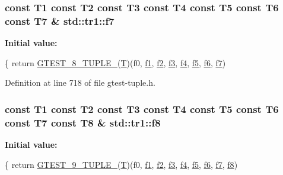 \subsubsection[{\texorpdfstring{f7}{f7}}]{\setlength{\rightskip}{0pt plus 5cm}const T1 const T2 const T3 const T4 const T5 const T6 const T7 \& std\+::tr1\+::f7}\hypertarget{namespacestd_1_1tr1_a2185f3a1c07f2df072c39cb91ffa89a4}{}\label{namespacestd_1_1tr1_a2185f3a1c07f2df072c39cb91ffa89a4}
{\bfseries Initial value\+:}
\begin{DoxyCode}
\{
  \textcolor{keywordflow}{return} \hyperlink{gtest-tuple_8h_a2bc36d1a71a551e6cda2ac5504fb7ce3}{GTEST\_8\_TUPLE\_}(\hyperlink{all__17_8js_adf1f3edb9115acb0a1e04209b7a9937b}{T})(f0, \hyperlink{namespacestd_1_1tr1_a9c0fa65b105f8e2f58ba59ecf75fd000}{f1}, \hyperlink{namespacestd_1_1tr1_a87dd9e009868361317f587126dba63d4}{f2}, \hyperlink{namespacestd_1_1tr1_a0f7c3b47d27d42d82d1a333ea420ce4e}{f3}, \hyperlink{namespacestd_1_1tr1_adc796e02b7385d526aff708189564f67}{f4}, \hyperlink{namespacestd_1_1tr1_a9c1eb66b2b2fa321942af95405232a0d}{f5}, \hyperlink{namespacestd_1_1tr1_a6b62f32e1e3e21bceb94eb46c4cbfd56}{f6}, 
      \hyperlink{namespacestd_1_1tr1_a2185f3a1c07f2df072c39cb91ffa89a4}{f7})
\end{DoxyCode}


Definition at line 718 of file gtest-\/tuple.\+h.

\subsubsection[{\texorpdfstring{f8}{f8}}]{\setlength{\rightskip}{0pt plus 5cm}const T1 const T2 const T3 const T4 const T5 const T6 const T7 const T8 \& std\+::tr1\+::f8}\hypertarget{namespacestd_1_1tr1_ab998afa41cea8d6d26d7e4288b0bf974}{}\label{namespacestd_1_1tr1_ab998afa41cea8d6d26d7e4288b0bf974}
{\bfseries Initial value\+:}
\begin{DoxyCode}
\{
  \textcolor{keywordflow}{return} \hyperlink{gtest-tuple_8h_a1a81c17bfe3cdceb4d56b15985a44a7e}{GTEST\_9\_TUPLE\_}(\hyperlink{all__17_8js_adf1f3edb9115acb0a1e04209b7a9937b}{T})(f0, \hyperlink{namespacestd_1_1tr1_a9c0fa65b105f8e2f58ba59ecf75fd000}{f1}, \hyperlink{namespacestd_1_1tr1_a87dd9e009868361317f587126dba63d4}{f2}, \hyperlink{namespacestd_1_1tr1_a0f7c3b47d27d42d82d1a333ea420ce4e}{f3}, \hyperlink{namespacestd_1_1tr1_adc796e02b7385d526aff708189564f67}{f4}, \hyperlink{namespacestd_1_1tr1_a9c1eb66b2b2fa321942af95405232a0d}{f5}, \hyperlink{namespacestd_1_1tr1_a6b62f32e1e3e21bceb94eb46c4cbfd56}{f6}, 
      \hyperlink{namespacestd_1_1tr1_a2185f3a1c07f2df072c39cb91ffa89a4}{f7}, \hyperlink{namespacestd_1_1tr1_ab998afa41cea8d6d26d7e4288b0bf974}{f8})
\end{DoxyCode}


